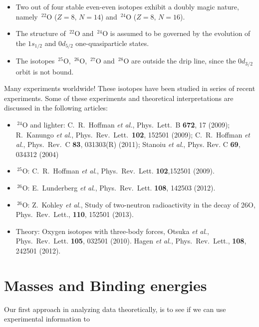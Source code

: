 \documentclass[%
twoside,                 %
final,                   %
10pt]{article}
\begin{document}
\begin{itemize}
\item Two out of four stable even-even isotopes exhibit a doubly magic nature, namely $\,{}^{22}\mbox{O}$ ($Z=8$, $N=14$) and $\,{}^{24}\mbox{O}$ ($Z=8$, $N=16$).

\item The structure of $\,{}^{22}\mbox{O}$ and $\,{}^{24}\mbox{O}$ is assumed to be governed by the evolution of the $1s_{1/2}$ and $0d_{5/2}$  one-quasiparticle states.

\item The isotopes $\,{}^{25}\mbox{O}$, $\,{}^{26}\mbox{O}$, $\,{}^{27}\mbox{O}$ and $\,{}^{28}\mbox{O}$ are outside the drip line, since the $0d_{3/2}$ orbit is not bound.
\end{itemize}

\noindent
 Many experiments worldwide!
These isotopes have been studied in series of recent experiments. Some of these experiments and theoretical interpretations are discussed in the following articles:

\begin{itemize}
\item $\,{}^{24}\mbox{O}$ and lighter:  C.~R.~Hoffman \emph{et al.}, Phys.~Lett.~B \textbf{672}, 17 (2009); R.~Kanungo \emph{et al}., Phys.~Rev.~Lett.~\textbf{102}, 152501 (2009); C.~R.~Hoffman \emph{et al}., Phys.~Rev.~C \textbf{83}, 031303(R) (2011); Stanoiu \emph{et al}., Phys. Rev. C \textbf{69}, 034312 (2004)

\item $\,{}^{25}\mbox{O}$: C.~R.~Hoffman \emph{et al}., Phys.~Rev.~Lett. \textbf{102},152501  (2009). 

\item $\,{}^{26}\mbox{O}$: E.~Lunderberg \emph{et al}., Phys.~Rev.~Lett. \textbf{108}, 142503 (2012). 

\item $\,{}^{26}\mbox{O}$: Z.~Kohley  \emph{et al}., Study of two-neutron radioactivity in the decay of 26O, Phys.~Rev.~Lett., \textbf{110}, 152501 (2013). 

\item Theory: Oxygen isotopes with three-body forces,  Otsuka \emph{et al}., Phys.~Rev.~Lett. \textbf{105}, 032501  (2010).  Hagen \emph{et al.}, Phys.~Rev.~Lett., \textbf{108}, 242501 (2012). 
\end{itemize}

\noindent
\section{Masses and Binding energies}
Our first approach in analyzing data theoretically, is to see if we can use experimental information to 
\end{document}
